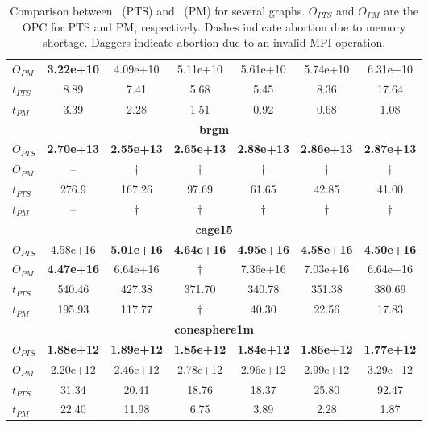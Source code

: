 \documentclass[fleqn,12pt,twoside]{article}
\begin{document}
\begin{table}[hbt]
\begin{center}
\begin{tabular}{|l||c|c|c|c|c|c|}
    $O_{PM}$  & \textbf{3.22e+10} & 4.09e+10 & 5.11e+10 & 5.61e+10  & 5.74e+10  & 6.31e+10  \\
    $t_{PTS}$ & 8.89     & 7.41     & 5.68     & 5.45     & 8.36     & 17.64   \\
    $t_{PM}$  & 3.39     & 2.28	    & 1.51     & 0.92     & 0.68     & 1.08     \\
    \hline
    \multicolumn{7}{|c|}{{\bf brgm}} \\
    \hline
    $O_{PTS}$ & \textbf{2.70e+13} & \textbf{2.55e+13} & \textbf{2.65e+13} & \textbf{2.88e+13} & \textbf{2.86e+13} & \textbf{2.87e+13} \\
    $O_{PM}$  & -- & $\dag$ & $\dag$ & $\dag$ & $\dag$ & $\dag$ \\
    $t_{PTS}$ & 276.9 & 167.26 & 97.69 & 61.65 & 42.85 & 41.00 \\
    $t_{PM}$  & -- & $\dag$ & $\dag$ & $\dag$ & $\dag$ & $\dag$ \\
    \hline
    \multicolumn{7}{|c|}{{\bf cage15}} \\
    \hline
    $O_{PTS}$ & 4.58e+16 & \textbf{5.01e+16} & \textbf{4.64e+16} & \textbf{4.95e+16} & \textbf{4.58e+16} & \textbf{4.50e+16} \\
    $O_{PM}$  & \textbf{4.47e+16} & 6.64e+16 & $\dag$ & 7.36e+16 & 7.03e+16 & 6.64e+16\\
    $t_{PTS}$ & 540.46 & 427.38 & 371.70 & 340.78 & 351.38 & 380.69 \\
    $t_{PM}$  & 195.93 & 117.77 & $\dag$ & 40.30 & 22.56 & 17.83 \\
    \hline
    \multicolumn{7}{|c|}{{\bf conesphere1m}} \\
    \hline
    $O_{PTS}$ & \textbf{1.88e+12} & \textbf{1.89e+12} & \textbf{1.85e+12} & \textbf{1.84e+12} & \textbf{1.86e+12} & \textbf{1.77e+12} \\
    $O_{PM}$  & 2.20e+12 & 2.46e+12 & 2.78e+12 & 2.96e+12 & 2.99e+12 & 3.29e+12 \\
    $t_{PTS}$ & 31.34    & 20.41    & 18.76    & 18.37    & 25.80    & 92.47    \\
    $t_{PM}$  & 22.40    & 11.98    & 6.75     & 3.89     & 2.28     & 1.87     \\
    \hline
  \end{tabular}
\end{center}
\caption{Comparison between \ptscotch\ (PTS) and \parmetis\ (PM) for
  several graphs. $O_{PTS}$ and $O_{PM}$ are the OPC for PTS and PM,
  respectively. Dashes indicate abortion due to memory shortage.
  Daggers indicate abortion due to an invalid MPI operation.}
\label{tabparmetis}
\end{table}
 
\end{document}
